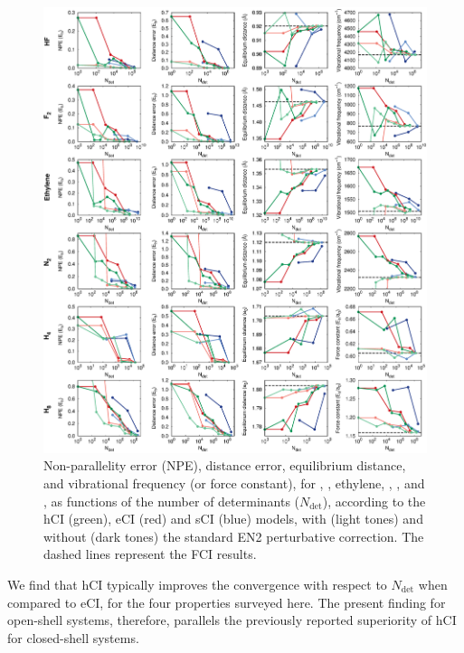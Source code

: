 \documentclass[aip,jcp,reprint,noshowkeys,superscriptaddress]{revtex4-1}
\newcommand{\Ndet}{N_\text{det}}
\begin{document}
\begin{figure}%
\includegraphics[width=1.0\linewidth]{plot_all_closed}
\caption{
Non-parallelity error (NPE), distance error, equilibrium distance, and vibrational frequency (or force constant), for , , ethylene, , , and , as functions of the number of determinants ($\Ndet$), according to the hCI (green), eCI (red) and sCI (blue) models,
with (light tones) and without (dark tones) the standard EN2 perturbative correction.
The dashed lines represent the FCI results.}
\label{fig:plot_all_closed}
\end{figure}

We find that hCI typically improves the convergence with respect to $\Ndet$ when compared to eCI, for the four properties surveyed here.
The present finding for open-shell systems, therefore, parallels the previously reported superiority of hCI for closed-shell systems. \cite{Kossoski_2022}
\end{document}
